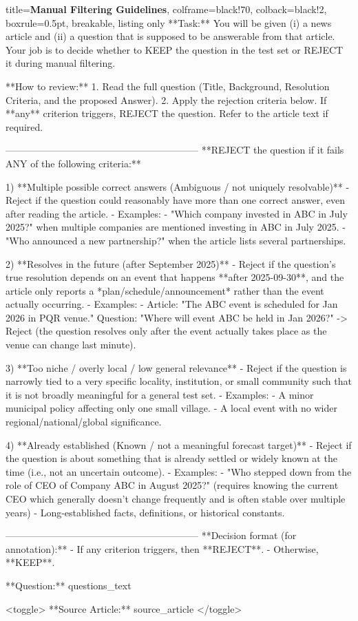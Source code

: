 \documentclass{article} %
\begin{document}
\begin{tcblisting}{
  title={\textbf{Manual Filtering Guidelines}},
  colframe=black!70,
  colback=black!2,
  boxrule=0.5pt,
  breakable,
  listing only
}
**Task:** You will be given (i) a news article and (ii) a question that is supposed to be answerable from that article. Your job is to decide whether to KEEP the question in the test set or REJECT it during manual filtering.

**How to review:**
1. Read the full question (Title, Background, Resolution Criteria, and the proposed Answer).
2. Apply the rejection criteria below. If **any** criterion triggers, REJECT the question. Refer to the article text if required.

------------------------------------------------------------
**REJECT the question if it fails ANY of the following criteria:**

1) **Multiple possible correct answers (Ambiguous / not uniquely resolvable)**
   - Reject if the question could reasonably have more than one correct answer, even after reading the article.
   - Examples:
     - "Which company invested in ABC in July 2025?" when multiple companies are mentioned investing in ABC in July 2025.
     - "Who announced a new partnership?" when the article lists several partnerships.

2) **Resolves in the future (after September 2025)**
   - Reject if the question's true resolution depends on an event that happens **after 2025-09-30**, and the article only reports a *plan/schedule/announcement* rather than the event actually occurring.
   - Examples:
     - Article: "The ABC event is scheduled for Jan 2026 in PQR venue."
       Question: "Where will event ABC be held in Jan 2026?" -> Reject (the question resolves only after the event actually takes place as the venue can change last minute).

3) **Too niche / overly local / low general relevance**
   - Reject if the question is narrowly tied to a very specific locality, institution, or small community such that it is not broadly meaningful for a general test set.
   - Examples:
     - A minor municipal policy affecting only one small village.
     - A local event with no wider regional/national/global significance.

4) **Already established (Known / not a meaningful forecast target)**
   - Reject if the question is about something that is already settled or widely known at the time (i.e., not an uncertain outcome).
   - Examples:
     - "Who stepped down from the role of CEO of Company ABC in August 2025?" (requires knowing the current CEO which generally doesn't change frequently and is often stable over multiple years)
     - Long-established facts, definitions, or historical constants.

------------------------------------------------------------
**Decision format (for annotation):**
- If any criterion triggers, then **REJECT**.
- Otherwise, **KEEP**.

**Question:**
{questions_text}

<toggle> **Source Article:** {source_article} </toggle>
\end{tcblisting}
\end{document}
